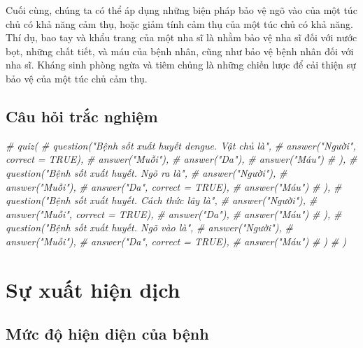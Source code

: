 \documentclass[
]{book}
\newenvironment{Shaded}{\begin{snugshade}}{\end{snugshade}}
\newcommand{\CommentTok}[1]{\textcolor[rgb]{0.56,0.35,0.01}{\textit{#1}}}
\begin{document}
Cuối cùng, chúng ta có thể áp dụng những biện pháp bảo vệ ngõ vào của một túc chủ có khả năng cảm thụ, hoặc giảm tính cảm thụ của một túc chủ có khả năng. Thí dụ, bao tay và khẩu trang của một nha sĩ là nhằm bảo vệ nha sĩ đối với nước bọt, những chất tiết, và máu của bệnh nhân, cũng như bảo vệ bệnh nhân đối với nha sĩ. Kháng sinh phòng ngừa và tiêm chủng là những chiến lược để cải thiện sự bảo vệ của một túc chủ cảm thụ.

\hypertarget{cuxe2u-hux1ecfi-trux1eafc-nghiux1ec7m-2}{%
\subsection{Câu hỏi trắc nghiệm}\label{cuxe2u-hux1ecfi-trux1eafc-nghiux1ec7m-2}}

\begin{Shaded}
\begin{Highlighting}[]
\CommentTok{\# quiz(}
\CommentTok{\#   question("Bệnh sốt xuất huyết dengue. Vật chủ là",}
\CommentTok{\#     answer("Người", correct = TRUE),}
\CommentTok{\#     answer("Muỗi"),}
\CommentTok{\#     answer("Da"),}
\CommentTok{\#     answer("Máu")}
\CommentTok{\#   ),}
\CommentTok{\#   question("Bệnh sốt xuất huyết. Ngõ ra là",}
\CommentTok{\#     answer("Người"),}
\CommentTok{\#     answer("Muỗi"),}
\CommentTok{\#     answer("Da", correct = TRUE),}
\CommentTok{\#     answer("Máu")}
\CommentTok{\#   ),}
\CommentTok{\#   question("Bệnh sốt xuất huyết. Cách thức lây là",}
\CommentTok{\#     answer("Người"),}
\CommentTok{\#     answer("Muỗi", correct = TRUE),}
\CommentTok{\#     answer("Da"),}
\CommentTok{\#     answer("Máu")}
\CommentTok{\#   ),}
\CommentTok{\#    question("Bệnh sốt xuất huyết. Ngõ vào là",}
\CommentTok{\#     answer("Người"),}
\CommentTok{\#     answer("Muỗi"),}
\CommentTok{\#     answer("Da", correct = TRUE),}
\CommentTok{\#     answer("Máu")}
\CommentTok{\#   )}
\CommentTok{\# )}
\end{Highlighting}
\end{Shaded}

\hypertarget{sux1ef1-xuux1ea5t-hiux1ec7n-dux1ecbch}{%
\section{Sự xuất hiện dịch}\label{sux1ef1-xuux1ea5t-hiux1ec7n-dux1ecbch}}

\hypertarget{mux1ee9c-ux111ux1ed9-hiux1ec7n-diux1ec7n-cux1ee7a-bux1ec7nh}{%
\subsection{Mức độ hiện diện của bệnh}\label{mux1ee9c-ux111ux1ed9-hiux1ec7n-diux1ec7n-cux1ee7a-bux1ec7nh}}
\end{document}
